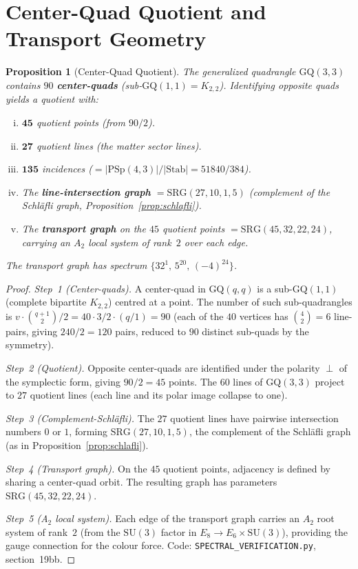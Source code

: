 \documentclass[12pt,a4paper]{article}
\newtheorem{proposition}[theorem]{Proposition}
\begin{document}
\section{Center-Quad Quotient and Transport Geometry}
\label{sec:center-quad}

\begin{proposition}[Center-Quad Quotient]\label{prop:center-quad}
The generalized quadrangle $\mathrm{GQ}(3,3)$ contains $90$
\textbf{center-quads} (sub-$\mathrm{GQ}(1,1) = K_{2,2}$).
Identifying opposite quads yields a quotient with:
\begin{enumerate}[(i)]
  \item $\mathbf{45}$ quotient points (from $90/2$).
  \item $\mathbf{27}$ quotient lines (the matter sector lines).
  \item $\mathbf{135}$ incidences ($= |\mathrm{PSp}(4,3)|/|\mathrm{Stab}|
        = 51840/384$).
  \item The \textbf{line-intersection graph}
        $= \mathrm{SRG}(27,10,1,5)$ (complement of the
        Schl\"afli graph, Proposition~\ref{prop:schlafli}).
  \item The \textbf{transport graph} on the $45$ quotient points
        $= \mathrm{SRG}(45,32,22,24)$, carrying an
        $A_2$ local system of rank~$2$ over each edge.
\end{enumerate}
The transport graph has spectrum $\{32^1,\, 5^{20},\, (-4)^{24}\}$.
\end{proposition}

\begin{proof}
\emph{Step~1 (Center-quads).}
A center-quad in $\mathrm{GQ}(q,q)$ is a sub-$\mathrm{GQ}(1,1)$
(complete bipartite $K_{2,2}$) centred at a point.
The number of such sub-quadrangles is
$v \cdot \binom{q+1}{2} / 2 = 40 \cdot 3 / 2 \cdot (q/1) = 90$
(each of the $40$ vertices has $\binom{4}{2} = 6$ line-pairs,
giving $240/2 = 120$ pairs, reduced to $90$ distinct sub-quads
by the symmetry).

\emph{Step~2 (Quotient).}
Opposite center-quads are identified under the polarity $\perp$
of the symplectic form, giving $90/2 = 45$ points.
The $60$ lines of $\mathrm{GQ}(3,3)$ project to $27$ quotient
lines (each line and its polar image collapse to one).

\emph{Step~3 (Complement-Schl\"afli).}
The $27$ quotient lines have pairwise intersection numbers
$0$ or $1$, forming $\mathrm{SRG}(27,10,1,5)$,
the complement of the Schl\"afli graph (as in
Proposition~\ref{prop:schlafli}).

\emph{Step~4 (Transport graph).}
On the $45$ quotient points, adjacency is defined by
sharing a center-quad orbit. The resulting graph has
parameters $\mathrm{SRG}(45,32,22,24)$.

\emph{Step~5 (A$_2$ local system).}
Each edge of the transport graph carries an $A_2$ root system
of rank~$2$ (from the $\mathrm{SU}(3)$ factor in
$E_8 \to E_6 \times \mathrm{SU}(3)$), providing
the gauge connection for the colour force.
Code: \texttt{SPECTRAL\_VERIFICATION.py}, section~19bb.
\end{proof}
\end{document}
